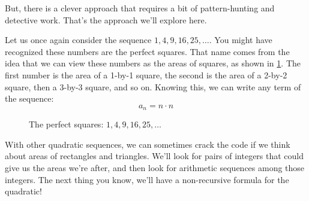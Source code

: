 But, there is a clever approach that requires a bit of pattern-hunting and detective work. That's the approach we'll explore here.

Let us once again consider the sequence $1, 4, 9, 16, 25, \dotsc$. You might have recognized these numbers are the \glspl{perfect square}. That name comes from the idea that we can view these numbers as the areas of squares, as shown in \cref{fig:perfsq}. The first number is the area of a 1-by-1 square, the second is the area of a 2-by-2 square, then a 3-by-3 square, and so on. Knowing this, we can write any term of the sequence: \[a_n = n \cdot n\]

\begin{figure}[!htbp]
\centering
{}
\caption{The perfect squares: $1, 4, 9, 16, 25, \dotsc$}
\label{fig:perfsq}
\end{figure}

With other quadratic sequences, we can sometimes crack the code if we think about areas of rectangles and triangles. We'll look for pairs of integers that could give us the areas we're after, and then look for arithmetic sequences among those integers. The next thing you know, we'll have a non-recursive formula for the quadratic!

